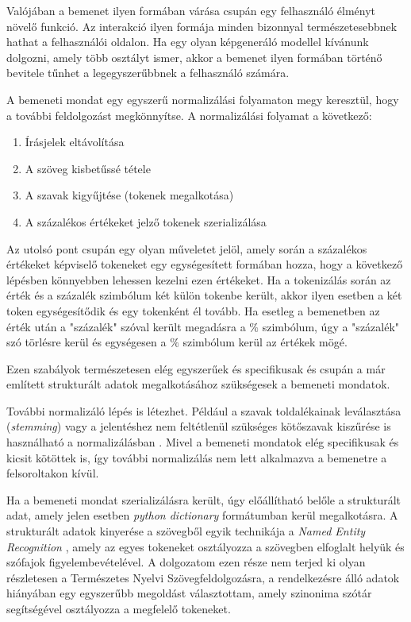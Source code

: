 Valójában a bemenet ilyen formában várása csupán egy felhasználó élményt növelő funkció. Az interakció ilyen formája minden bizonnyal természetesebbnek hathat a felhasználói oldalon. Ha egy olyan képgeneráló modellel kívánunk dolgozni, amely több osztályt ismer, akkor a bemenet ilyen formában történő bevitele tűnhet a legegyszerűbbnek a felhasználó számára.

A bemeneti mondat egy egyszerű normalizálási folyamaton megy keresztül, hogy a további feldolgozást megkönnyítse. A normalizálási folyamat a következő:

\begin{enumerate}
	\item Írásjelek eltávolítása
	\item A szöveg kisbetűssé tétele
	\item A szavak kigyűjtése (tokenek megalkotása)
	\item A százalékos értékeket jelző tokenek szerializálása
\end{enumerate}

Az utolsó pont csupán egy olyan műveletet jelöl, amely során a százalékos értékeket képviselő tokeneket egy egységesített formában hozza, hogy a következő lépésben könnyebben lehessen kezelni ezen értékeket. Ha a tokenizálás során az érték és a százalék szimbólum két külön tokenbe került, akkor ilyen esetben a két token egységesítődik és egy tokenként él tovább. Ha esetleg a bemenetben az érték után a "százalék" szóval került megadásra a $\%$ szimbólum, úgy a "százalék" szó törlésre kerül és egységesen a $\%$ szimbólum kerül az értékek mögé.

Ezen szabályok természetesen elég egyszerűek és specifikusak és csupán a már említett strukturált adatok megalkotásához szükségesek a bemeneti mondatok.

További normalizáló lépés is létezhet. Például a szavak toldalékainak leválasztása (\textit{stemming}) vagy a jelentéshez nem feltétlenül szükséges kötőszavak kiszűrése is használható a normalizálásban \cite{bird2009natural}. Mivel a bemeneti mondatok elég specifikusak és kicsit kötöttek is, így további normalizálás nem lett alkalmazva a bemenetre a felsoroltakon kívül.


Ha a bemeneti mondat szerializálásra került, úgy előállítható belőle a strukturált adat, amely jelen esetben \textit{python dictionary} formátumban kerül megalkotásra. A strukturált adatok kinyerése a szövegből egyik technikája a \textit{Named Entity Recognition} \cite{bird2009natural}, amely az egyes tokeneket osztályozza a szövegben elfoglalt helyük és szófajok figyelembevételével. A dolgozatom ezen része nem terjed ki olyan részletesen a Természetes Nyelvi Szövegfeldolgozásra, a rendelkezésre álló adatok hiányában egy egyszerűbb megoldást választottam, amely szinonima szótár segítségével osztályozza a megfelelő tokeneket.


